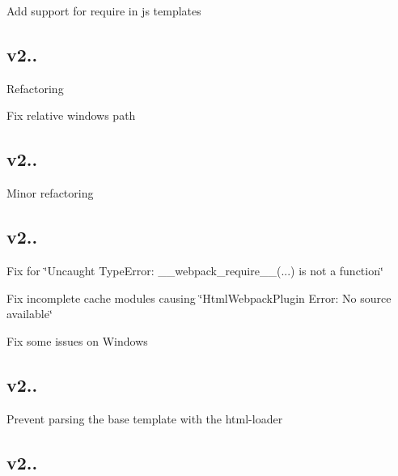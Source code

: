 \begin{DoxyItemize}
\item Add support for require in js templates
\end{DoxyItemize}

\subsection*{v2.. }


\begin{DoxyItemize}
\item Refactoring
\item Fix relative windows path
\end{DoxyItemize}

\subsection*{v2.. }


\begin{DoxyItemize}
\item Minor refactoring
\end{DoxyItemize}

\subsection*{v2.. }


\begin{DoxyItemize}
\item Fix for {\ttfamily \char`\"{}\+Uncaught Type\+Error\+: \+\_\+\+\_\+webpack\+\_\+require\+\_\+\+\_\+(...) is not a function\char`\"{}}
\item Fix incomplete cache modules causing \char`\"{}\+Html\+Webpack\+Plugin Error\+: No source available\char`\"{}
\item Fix some issues on Windows
\end{DoxyItemize}

\subsection*{v2.. }


\begin{DoxyItemize}
\item Prevent parsing the base template with the html-\/loader
\end{DoxyItemize}

\subsection*{v2.. }


